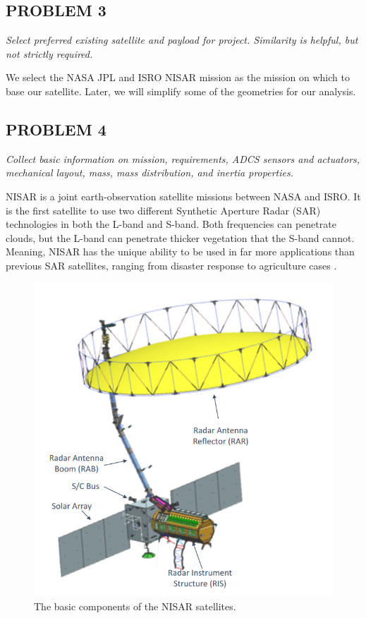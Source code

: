 \subsection{PROBLEM 3}
\textit{Select preferred existing satellite and payload for project. Similarity is helpful, but not strictly required.}

We select the NASA JPL and ISRO NISAR mission as the mission on which to base our satellite. Later, we will simplify some of the geometries for our analysis.

\subsection{PROBLEM 4}
\textit{Collect basic information on mission, requirements, ADCS sensors and actuators, mechanical layout, mass, mass distribution, and inertia properties.}

NISAR is a joint earth-observation satellite missions between NASA and ISRO. It is the first satellite to use two different Synthetic Aperture Radar (SAR) technologies in both the L-band and S-band. Both frequencies can penetrate clouds, but the L-band can penetrate thicker vegetation that the S-band cannot. Meaning, NISAR has the unique ability to be used in far more applications than previous SAR satellites, ranging from disaster response to agriculture cases \cite{NisarApps}.

\begin{figure}[H]
\centering
\includegraphics[scale=0.4]{Images/NISAR Diagram.jpg}
\caption{The basic components of the NISAR satellites.}
\label{NISAR Diagram}
\end{figure}

